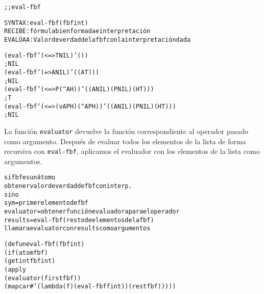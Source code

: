 \begin{aibox}{\function}
\begin{alltt}
;; eval-fbf

SYNTAX: eval-fbf (fbf int)
RECIBE: fórmula bien formada e interpretación
EVALÚA A : Valor de verdad de la fbf con la interpretación dada

\end{alltt}
\end{aibox}

\begin{aibox}{\examples}
\begin{alltt}
(eval-fbf '(<=> T NIL) '())
; NIL
(eval-fbf '(=> A NIL) '((A T)))
; NIL
(eval-fbf '(<=> P (^ A  H)) '((A NIL) (P NIL) (H T)))
; T
(eval-fbf '(<=> (v A P H) (^ A P H)) '((A NIL) (P NIL) (H T)))
; NIL
\end{alltt}

\end{aibox}

\begin{aibox}{\comments}
La función \texttt{evaluator} devuelve la función correspondiente al operador pasado como argumento. Después de evaluar todos los elementos de la lista de forma recursiva con \texttt{eval-fbf}, aplicamos el evaluador con los elementos de la lista como argumentos.
\end{aibox}

\begin{aibox}{\pseudocode}
\begin{alltt}
si fbf es un átomo
	obtener valor de verdad de fbf con interp.
si no
	sym = primer elemento de fbf
	evaluator = obtener función evaluadora para el operador
	results = eval-fbf(resto de elementos de la fbf)
	llamar a evaluator con results como argumentos

\end{alltt}
\end{aibox}
\begin{aibox}{\code}

\begin{alltt}
(defun eval-fbf (fbf int)
   	(if (atom fbf)
         (getint fbf int)
         (apply 
           (evaluator (first fbf)) 
           (mapcar #'(lambda (f) (eval-fbf f int)) (rest fbf)))))

\end{alltt}
\end{aibox}
